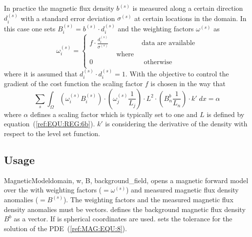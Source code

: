 In practice the magnetic flux density $b^{(s)}$ is measured along a certain
direction $d^{(s)}_i$ with a standard error deviation $\sigma^{(s)}$ at
certain locations in the domain.
In this case one sets $B^{(s)}_i=b^{(s)} \cdot d^{(s)}_i$ and the weighting
factors $\omega^{(s)}$ as
\begin{equation}\label{ref:MAG:EQU:11}
\omega^{(s)}_i 
= \left\{
\begin{array}{lcl}
f \cdot  \frac{d^{(s)}_i}{\sigma^{(s)}} & & \mbox{data are available} \\
& \mbox{ where } & \\
0 & & \mbox{ otherwise } \\
\end{array}
\right.
\end{equation} 
where it is assumed that $d^{(s)}_i \cdot d^{(s)}_i =1$. With the objective to control the 
gradient of the cost function the scaling factor $f$ is chosen in the way that 
\begin{equation}\label{ref:MAG:EQU:12}
\sum_{s} \int_{\Omega} ( \omega^{(s)}_i B^{(s)}_i ) 
 \cdot ( \omega^{(s)}_j \frac{1}{L_j} ) \cdot L^2 \cdot
( B^b_n \frac{1}{L_n} )
 \cdot k' \;
 dx =\alpha
\end{equation} 
where $\alpha$ defines a scaling factor which is typically set to one and $L$ is defined by equation~(\ref{ref:EQU:REG:6b}).
$k'$ is considering the 
derivative of the density with respect to the level set function. 

\subsection{Usage}


\begin{classdesc}{MagneticModel}{domain, w, B, background_field,
        }
opens a magnetic forward model over the \Domain {} with 
weighting factors  ($=\omega^{(s)}$) and measured magnetic flux
density anomalies  ($=B^{(s)}$).
The weighting factors and the  measured magnetic flux density anomalies must be vectors.
 defines the background magnetic flux density $B^b$
as a vector.
If  is \True spherical coordinates are used. 
 sets the tolerance for the solution of the PDE~(\ref{ref:MAG:EQU:8}).
\end{classdesc}

